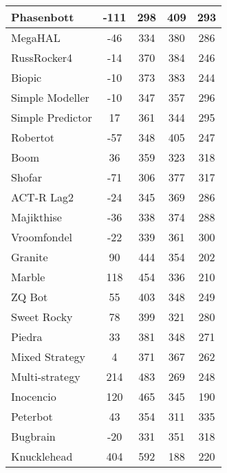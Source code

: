 \begin{table}
\begin{tabular}{|l|c|c|c|c|}
Phasenbott & -111 & 298 & 409 & 293 \\ \hline 
MegaHAL & -46 & 334 & 380 & 286 \\ \hline 
RussRocker4 & -14 & 370 & 384 & 246 \\ \hline 
Biopic & -10 & 373 & 383 & 244 \\ \hline 
Simple Modeller & -10 & 347 & 357 & 296 \\ \hline 
Simple Predictor & 17 & 361 & 344 & 295 \\ \hline 
Robertot & -57 & 348 & 405 & 247 \\ \hline 
Boom & 36 & 359 & 323 & 318 \\ \hline 
Shofar & -71 & 306 & 377 & 317 \\ \hline 
ACT-R Lag2 & -24 & 345 & 369 & 286 \\ \hline 
Majikthise & -36 & 338 & 374 & 288 \\ \hline 
Vroomfondel & -22 & 339 & 361 & 300 \\ \hline 
\rowcolor{HighlightRowColor} Granite & 90 & 444 & 354 & 202 \\ \hline 
\rowcolor{HighlightRowColor} Marble & 118 & 454 & 336 & 210 \\ \hline 
\rowcolor{HighlightRowColor} ZQ Bot & 55 & 403 & 348 & 249 \\ \hline 
\rowcolor{HighlightRowColor} Sweet Rocky & 78 & 399 & 321 & 280 \\ \hline 
Piedra & 33 & 381 & 348 & 271 \\ \hline 
Mixed Strategy & 4 & 371 & 367 & 262 \\ \hline 
\rowcolor{HighlightRowColor} Multi-strategy & 214 & 483 & 269 & 248 \\ \hline 
\rowcolor{HighlightRowColor} Inocencio & 120 & 465 & 345 & 190 \\ \hline 
Peterbot & 43 & 354 & 311 & 335 \\ \hline 
Bugbrain & -20 & 331 & 351 & 318 \\ \hline 
\rowcolor{HighlightRowColor} Knucklehead & 404 & 592 & 188 & 220 \\ \hline
        \end{tabular}
    \end{table}